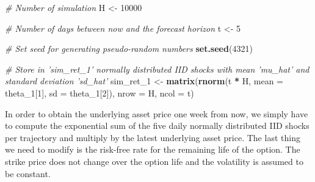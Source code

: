 \documentclass[]{article}
\newenvironment{Shaded}{\begin{snugshade}}{\end{snugshade}}
\newcommand{\CommentTok}[1]{\textcolor[rgb]{0.56,0.35,0.01}{\textit{#1}}}
\newcommand{\DataTypeTok}[1]{\textcolor[rgb]{0.13,0.29,0.53}{#1}}
\newcommand{\DecValTok}[1]{\textcolor[rgb]{0.00,0.00,0.81}{#1}}
\newcommand{\KeywordTok}[1]{\textcolor[rgb]{0.13,0.29,0.53}{\textbf{#1}}}
\newcommand{\NormalTok}[1]{#1}
\newcommand{\OperatorTok}[1]{\textcolor[rgb]{0.81,0.36,0.00}{\textbf{#1}}}
\newcommand{\StringTok}[1]{\textcolor[rgb]{0.31,0.60,0.02}{#1}}
\begin{document}
\begin{Shaded}
\begin{Highlighting}[]
\CommentTok{# Number of simulation}
\NormalTok{H <-}\StringTok{ }\DecValTok{10000}

\CommentTok{# Number of days between now and the forecast horizon}
\NormalTok{t <-}\StringTok{ }\DecValTok{5}

\CommentTok{# Set seed for generating pseudo-random numbers}
\KeywordTok{set.seed}\NormalTok{(}\DecValTok{4321}\NormalTok{)}

\CommentTok{# Store in 'sim_ret_1' normally distributed IID shocks with mean 'mu_hat' and standard deviation 'sd_hat'}
\NormalTok{sim_ret_}\DecValTok{1}\NormalTok{ <-}\StringTok{ }\KeywordTok{matrix}\NormalTok{(}\KeywordTok{rnorm}\NormalTok{(t }\OperatorTok{*}\StringTok{ }\NormalTok{H, }\DataTypeTok{mean =}\NormalTok{ theta_}\DecValTok{1}\NormalTok{[}\DecValTok{1}\NormalTok{], }\DataTypeTok{sd =}\NormalTok{ theta_}\DecValTok{1}\NormalTok{[}\DecValTok{2}\NormalTok{]), }\DataTypeTok{nrow =}\NormalTok{ H, }\DataTypeTok{ncol =}\NormalTok{ t)}
\end{Highlighting}
\end{Shaded}

In order to obtain the underlying asset price one week from now, we
simply have to compute the exponential sum of the five daily normally
distributed IID shocks per trajectory and multiply by the latest
underlying asset price. The last thing we need to modify is the
risk-free rate for the remaining life of the option. The strike price
does not change over the option life and the volatility is assumed to be
constant.
\end{document}
